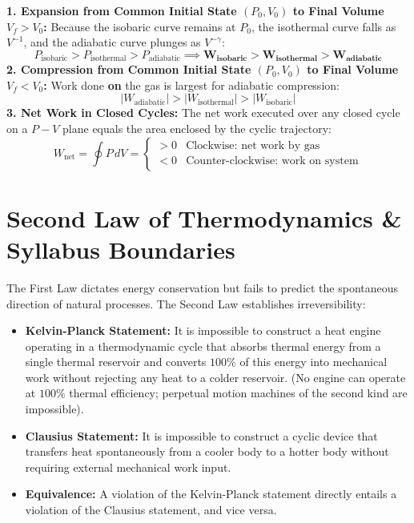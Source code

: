 \documentclass[10pt,twoside,openright]{book}
\begin{document}
\begin{formulabox}
\textbf{1. Expansion from Common Initial State $(P_0, V_0)$ to Final Volume $V_f > V_0$:}
Because the isobaric curve remains at $P_0$, the isothermal curve falls as $V^{-1}$, and the adiabatic curve plunges as $V^{-\gamma}$:
\begin{equation}
  P_{\text{isobaric}} > P_{\text{isothermal}} > P_{\text{adiabatic}} \implies \mathbf{W_{\text{isobaric}} > W_{\text{isothermal}} > W_{\text{adiabatic}}}
\end{equation}
\textbf{2. Compression from Common Initial State $(P_0, V_0)$ to Final Volume $V_f < V_0$:}
Work done \textbf{on} the gas is largest for adiabatic compression:
\begin{equation}
  |W_{\text{adiabatic}}| > |W_{\text{isothermal}}| > |W_{\text{isobaric}}|
\end{equation}
\textbf{3. Net Work in Closed Cycles:}
The net work executed over any closed cycle on a $P-V$ plane equals the area enclosed by the cyclic trajectory:
\begin{equation}
  W_{\text{net}} = \oint P\,dV = \begin{cases} > 0 & \text{Clockwise: net work by gas} \\ < 0 & \text{Counter-clockwise: work on system} \end{cases}
\end{equation}
\end{formulabox}

\section{Second Law of Thermodynamics \& Syllabus Boundaries}

\begin{conceptbox}
The First Law dictates energy conservation but fails to predict the spontaneous direction of natural processes. The Second Law establishes irreversibility:
\begin{itemize}
  \item \textbf{Kelvin-Planck Statement:} It is impossible to construct a heat engine operating in a thermodynamic cycle that absorbs thermal energy from a single thermal reservoir and converts $100\%$ of this energy into mechanical work without rejecting any heat to a colder reservoir. (No engine can operate at $100\%$ thermal efficiency; perpetual motion machines of the second kind are impossible).
  \item \textbf{Clausius Statement:} It is impossible to construct a cyclic device that transfers heat spontaneously from a cooler body to a hotter body without requiring external mechanical work input.
  \item \textbf{Equivalence:} A violation of the Kelvin-Planck statement directly entails a violation of the Clausius statement, and vice versa.
\end{itemize}
\end{conceptbox}
\end{document}
